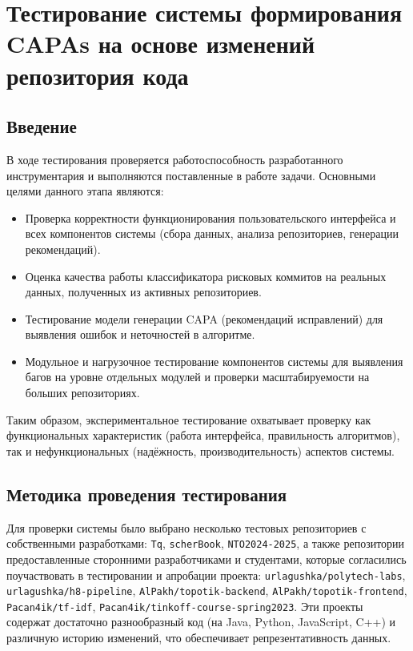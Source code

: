 \chapter{Тестирование системы формирования CAPAs на основе изменений репозитория кода} \section{Введение}
В ходе тестирования проверяется работоспособность разработанного инструментария и выполняются поставленные в работе задачи. Основными целями данного этапа являются:
\begin{itemize}
	\item Проверка корректности функционирования пользовательского интерфейса и всех компонентов системы (сбора данных, анализа репозиториев, генерации рекомендаций).
	\item Оценка качества работы классификатора рисковых коммитов на реальных данных, полученных из активных репозиториев.
	\item Тестирование модели генерации CAPA (рекомендаций исправлений) для выявления ошибок и неточностей в алгоритме.
	\item Модульное и нагрузочное тестирование компонентов системы для выявления багов на уровне отдельных модулей и проверки масштабируемости на больших репозиториях.
\end{itemize}
Таким образом, экспериментальное тестирование охватывает проверку как функциональных характеристик (работа интерфейса, правильность алгоритмов), так и нефункциональных (надёжность, производительность) аспектов системы.

\section{Методика проведения тестирования}
Для проверки системы было выбрано несколько тестовых репозиториев с собственными разработками: \texttt{Tq}, \texttt{scherBook}, \texttt{NTO2024-2025}, а также репозитории предоставленные сторонними разработчиками и студентами, которые согласились поучаствовать в тестировании и апробации проекта: \texttt{urlagushka/polytech-labs}, \texttt{urlagushka/h8-pipeline}, \texttt{AlPakh/topotik-backend}, \texttt{AlPakh/topotik-frontend}, \texttt{Pacan4ik/tf-idf}, \texttt{Pacan4ik/tinkoff-course-spring2023}. Эти проекты содержат достаточно разнообразный код (на Java, Python, JavaScript, C++) и различную историю изменений, что обеспечивает репрезентативность данных.


